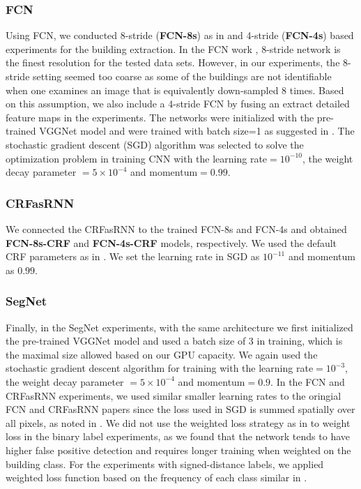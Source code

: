 \documentclass[journal]{IEEEtran}
\begin{document}
\subsubsection{FCN}
Using FCN, we conducted 8-stride (\textbf{FCN-8s}) as in \cite{ShelhamerLongDarrell2017} and  4-stride (\textbf{FCN-4s}) based experiments for the building extraction. In the FCN work \cite{ShelhamerLongDarrell2017}, 8-stride network is the finest resolution for the tested data sets. However, in our experiments, the 8-stride setting seemed too coarse as some of the buildings are not identifiable when one examines an image that is equivalently down-sampled 8 times. Based on this assumption, we also include a 4-stride FCN by fusing an extract detailed feature maps in the experiments. The networks were initialized with the pre-trained VGGNet \cite{Simonyan2015} model and were trained with batch size=1 as suggested in \cite{ShelhamerLongDarrell2017}. The stochastic gradient descent (SGD) algorithm was selected to solve the optimization problem in training CNN with the learning rate$=10^{-10}$, the weight decay parameter $=5\times10^{-4}$ and momentum$=0.99$. 

\subsubsection{CRFasRNN}
We connected the CRFasRNN to the trained FCN-8s and FCN-4s and obtained \textbf{FCN-8s-CRF} and \textbf{FCN-4s-CRF} models, respectively. We used the default CRF parameters as in \cite{ZhengJayasumanaRomera-ParedesEtAl2015}. We set the learning rate in SGD as $10^{-11}$ and momentum as $0.99$.
\subsubsection{SegNet}
Finally, in the SegNet experiments, with the same architecture we first initialized the pre-trained VGGNet \cite{Simonyan2015} model and used a batch size of 3 in training, which is the maximal size allowed based on our GPU capacity. We again used the stochastic gradient descent algorithm for training with the learning rate$=10^{-3}$, the weight decay parameter $=5\times10^{-4}$ and momentum$=0.9$. 
In the FCN and CRFasRNN experiments, we used  similar smaller learning rates to the oringial FCN and CRFasRNN papers since the loss used in SGD is summed spatially over all pixels, as noted in \cite{ShelhamerLongDarrell2017}.
We did not use the weighted loss strategy as in \cite{BadrinarayananKendallCipolla2017} to weight loss in the binary label experiments, as we found that the network tends to have higher false positive detection and requires longer training when weighted on the building class. For the experiments with signed-distance labels, we applied weighted loss function based on the frequency of each class similar in \cite{XieTu2015}.
\end{document}
